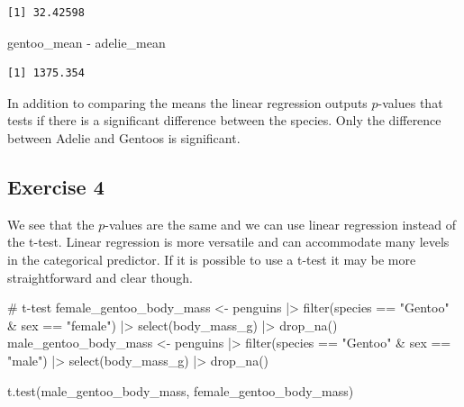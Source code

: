 \documentclass[
  letterpaper,
  DIV=11,
  numbers=noendperiod]{scrreprt}
\newenvironment{Shaded}{\begin{snugshade}}{\end{snugshade}}
\newcommand{\CommentTok}[1]{\textcolor[rgb]{0.37,0.37,0.37}{#1}}
\newcommand{\FunctionTok}[1]{\textcolor[rgb]{0.28,0.35,0.67}{#1}}
\newcommand{\NormalTok}[1]{\textcolor[rgb]{0.00,0.23,0.31}{#1}}
\newcommand{\OtherTok}[1]{\textcolor[rgb]{0.00,0.23,0.31}{#1}}
\newcommand{\SpecialCharTok}[1]{\textcolor[rgb]{0.37,0.37,0.37}{#1}}
\newcommand{\StringTok}[1]{\textcolor[rgb]{0.13,0.47,0.30}{#1}}
\begin{document}
\begin{verbatim}
[1] 32.42598
\end{verbatim}

\begin{Shaded}
\begin{Highlighting}[]
\NormalTok{gentoo\_mean }\SpecialCharTok{{-}}\NormalTok{ adelie\_mean}
\end{Highlighting}
\end{Shaded}

\begin{verbatim}
[1] 1375.354
\end{verbatim}

In addition to comparing the means the linear regression outputs
\(p\)-values that tests if there is a significant difference between the
species. Only the difference between Adelie and Gentoos is significant.

\subsection{Exercise 4}\label{exercise-4-12}

We see that the \(p\)-values are the same and we can use linear
regression instead of the t-test. Linear regression is more versatile
and can accommodate many levels in the categorical predictor. If it is
possible to use a t-test it may be more straightforward and clear
though.

\begin{Shaded}
\begin{Highlighting}[]
\CommentTok{\# t{-}test}
\NormalTok{female\_gentoo\_body\_mass }\OtherTok{\textless{}{-}}\NormalTok{ penguins }\SpecialCharTok{|\textgreater{}}
  \FunctionTok{filter}\NormalTok{(species }\SpecialCharTok{==} \StringTok{"Gentoo"} \SpecialCharTok{\&}\NormalTok{ sex }\SpecialCharTok{==} \StringTok{"female"}\NormalTok{) }\SpecialCharTok{|\textgreater{}}
  \FunctionTok{select}\NormalTok{(body\_mass\_g) }\SpecialCharTok{|\textgreater{}}
  \FunctionTok{drop\_na}\NormalTok{()}
\NormalTok{male\_gentoo\_body\_mass }\OtherTok{\textless{}{-}}\NormalTok{ penguins }\SpecialCharTok{|\textgreater{}}
  \FunctionTok{filter}\NormalTok{(species }\SpecialCharTok{==} \StringTok{"Gentoo"} \SpecialCharTok{\&}\NormalTok{ sex }\SpecialCharTok{==} \StringTok{"male"}\NormalTok{) }\SpecialCharTok{|\textgreater{}}
  \FunctionTok{select}\NormalTok{(body\_mass\_g) }\SpecialCharTok{|\textgreater{}}
  \FunctionTok{drop\_na}\NormalTok{()}

\FunctionTok{t.test}\NormalTok{(male\_gentoo\_body\_mass, female\_gentoo\_body\_mass)}
\end{Highlighting}
\end{Shaded}
\end{document}
